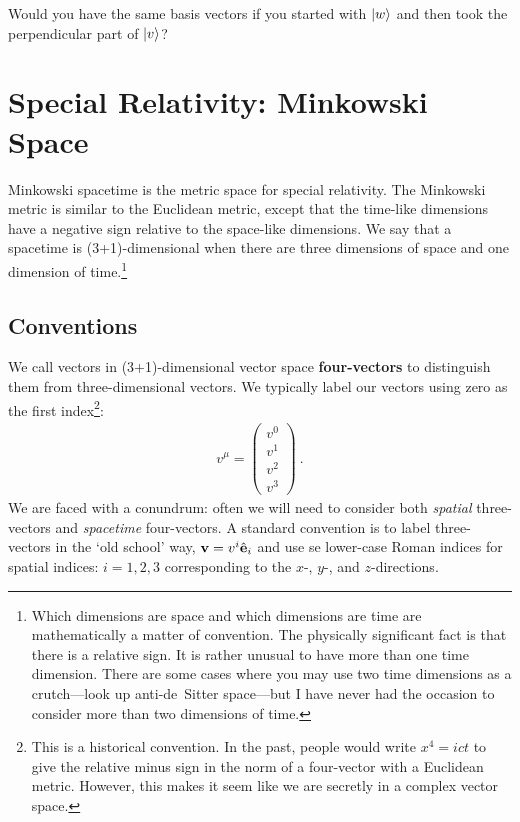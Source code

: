 \documentclass[12pt]{article}
\begin{document}
\begin{exercise}
Would you have the same basis vectors if you started with $\left|w\right\rangle$ and then took the perpendicular part of $\left|v\right\rangle$?
\end{exercise}



\section{Special Relativity: Minkowski Space}


Minkowski spacetime is the metric space for special relativity. The Minkowski metric is similar to the Euclidean metric, except that the time-like dimensions have a negative sign relative to the space-like dimensions. We say that a spacetime is (3+1)-dimensional when there are three dimensions of space and one dimension of time.\footnote{Which dimensions are space and which dimensions are time are mathematically a matter of convention. The physically significant fact is that there is a relative sign. It is rather unusual to have more than one time dimension. There are some cases where you may use two time dimensions as a crutch---look up anti-de~Sitter space---but I have never had the occasion to consider more than two dimensions of time.} 


\subsection{Conventions}

We call vectors in (3+1)-dimensional vector space \textbf{four-vectors} to distinguish them from three-dimensional vectors. We typically label our vectors using zero as the first index\footnote{This is a historical convention. In the past, people would write $x^4 = ict$ to give the relative minus sign in the norm of a four-vector with a Euclidean metric. However, this makes it seem like we are secretly in a complex vector space.}:
\begin{align}
    v^\mu = 
    \begin{pmatrix}
    v^0 \\ v^1 \\ v^2 \\ v^3    
    \end{pmatrix} \ .
\end{align}
We are faced with a conundrum: often we will need to consider both \emph{spatial} three-vectors and \emph{spacetime} four-vectors. A standard convention is to label three-vectors in the `old school' way, $\mathbf{v} = v^i \hat{\mathbf{e}}_i$ and use se lower-case Roman indices for spatial indices: $i=1,2,3$ corresponding to the $x$-, $y$-, and $z$-directions. 
\end{document}
